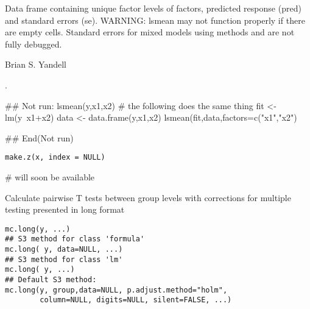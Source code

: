 \documentclass[a4paper]{book}
\begin{document}
%
\begin{Value}
Data frame containing unique factor levels of factors, predicted
response (pred) and standard errors (se). WARNING: lsmean may not
function properly if there are empty cells. Standard errors for mixed
models using methods  and  are not fully
debugged.
\end{Value}
%
\begin{Author}\relax
Brian S. Yandell
\end{Author}
%
\begin{SeeAlso}\relax
{}.
\end{SeeAlso}
%
\begin{Examples}
\begin{ExampleCode}
## Not run: 
lsmean(y,x1,x2)
# the following does the same thing
fit <- lm(y~x1+x2)
data <- data.frame(y,x1,x2)
lsmean(fit,data,factors=c("x1","x2")

## End(Not run)
\end{ExampleCode}
\end{Examples}
\newpage
{}
%
\begin{Usage}
\begin{verbatim}
make.z(x, index = NULL)
\end{verbatim}
\end{Usage}
%
\begin{Arguments}
\begin{ldescription}
\item[\code{x}] 


\item[\code{index}] 


\end{ldescription}
\end{Arguments}
%
\begin{Examples}
\begin{ExampleCode}
# will soon be available
\end{ExampleCode}
\end{Examples}
\newpage
{}
%
\begin{Description}\relax
Calculate pairwise T tests between group levels with corrections for multiple testing presented in long format
\end{Description}
%
\begin{Usage}
\begin{verbatim}
mc.long(y, ...)
## S3 method for class 'formula'
mc.long( y, data=NULL, ...)
## S3 method for class 'lm'
mc.long( y, ...)
## Default S3 method:
mc.long(y, group,data=NULL, p.adjust.method="holm",
        column=NULL, digits=NULL, silent=FALSE, ...)
\end{verbatim}
\end{Usage}
\end{document}

